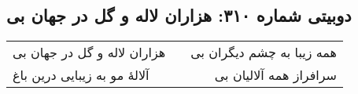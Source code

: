 \begin{center}
\section*{دوبیتی شماره ۳۱۰: هزاران لاله و گل در جهان بی}
\label{sec:310}
\begin{longtable}{l p{0.5cm} r}
هزاران لاله و گل در جهان بی
&&
همه زیبا به چشم دیگران بی
\\
آلالهٔ مو به زیبایی درین باغ
&&
سرافراز همه آلالیان بی
\\
\end{longtable}
\end{center}
